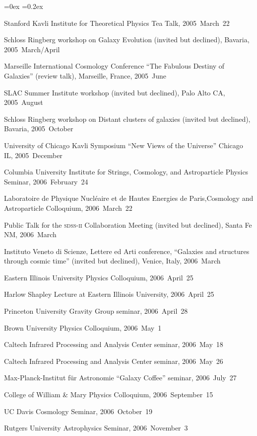 \documentclass[12pt,letterpaper]{article}
\newcounter{refpubnum}
\newcommand{\hogglist}{%
    \rightmargin=0in
    \leftmargin=0.18in
    \topsep=0ex
    \partopsep=0pt
    \itemsep=0.2ex
    \parsep=0pt
    \itemindent=-1.0\leftmargin
    \listparindent=0.0\leftmargin
    \settowidth{\labelsep}{~}
    \usecounter{refpubnum}
  }
\begin{document}
\begin{list}{}{\hogglist}
{\item Stanford Kavli Institute for Theoretical Physics Tea Talk, 2005~March~22
\item Schloss Ringberg workshop on Galaxy Evolution (invited but declined), Bavaria, 2005~March/April
\item Marseille International Cosmology Conference ``The Fabulous Destiny of Galaxies'' (review talk), Marseille, France, 2005~June
\item SLAC Summer Institute workshop (invited but declined), Palo Alto CA, 2005~August
\item Schloss Ringberg workshop on Distant clusters of galaxies (invited but declined), Bavaria, 2005~October
\item University of Chicago Kavli Symposium ``New Views of the Universe'' Chicago IL, 2005~December
\item Columbia University Institute for Strings, Cosmology, and Astroparticle Physics Seminar, 2006~February~24
\item Laboratoire de Physique Nucl\'{e}aire et de Hautes Energies de Paris,Cosmology and Astroparticle Colloquium, 2006~March~22
\item Public Talk for the \textsc{sdss-ii} Collaboration Meeting (invited but declined), Santa Fe NM, 2006~March
\item Instituto Veneto di Scienze, Lettere ed Arti conference, ``Galaxies and structures through cosmic time'' (invited but declined), Venice, Italy, 2006~March
\item Eastern Illinois University Physics Colloquium, 2006~April~25
\item Harlow Shapley Lecture at Eastern Illinois University, 2006~April~25
\item Princeton University Gravity Group seminar, 2006~April~28
\item Brown University Physics Colloquium, 2006~May~1
\item Caltech Infrared Processing and Analysis Center seminar, 2006~May~18
\item Caltech Infrared Processing and Analysis Center seminar, 2006~May~26
\item Max-Planck-Institut f\"ur Astronomie ``Galaxy Coffee'' seminar, 2006~July~27
\item College of William \& Mary Physics Colloquium, 2006~September~15
\item UC Davis Cosmology Seminar, 2006~October~19
\item Rutgers University Astrophysics Seminar, 2006~November~3
}
\end{list}
\end{document}
